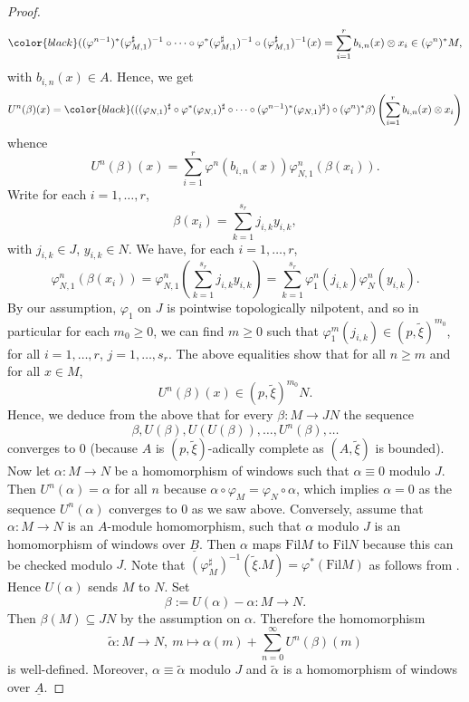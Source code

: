 \documentclass{amsart}
\theoremstyle{plain}
\theoremstyle{definition}
\newcommand{\tilxi}{\tilde{\xi}}
\newcommand{\blue}[1]{{\color{black}#1}}
\begin{document}
\begin{proof}
  $$
    \blue{ ((\varphi^{n-1})^\ast (\varphi_{M,1}^\sharp)^{-1} \circ \dots \circ \varphi^\ast (\varphi_{M,1}^\sharp)^{-1} \circ (\varphi_{M,1}^\sharp)^{-1} (x) } = \sum_{i=1}^r b_{i,n}(x) \otimes x_i \in (\varphi^n)^\ast M, 
   $$
   with $b_{i,n}(x) \in A$.
   Hence, we get 
   $$
   U^n(\beta)(x)= \blue{(((\varphi_{N,1})^\sharp \circ \varphi^\ast (\varphi_{N,1})^\sharp  \circ \dots \circ (\varphi^{n-1})^\ast (\varphi_{N,1})^\sharp) }\circ (\varphi^n)^\ast \beta) \left(  \sum_{i=1}^r b_{i,n}(x) \otimes x_i \right)
   $$ 
    whence
   $$
   U^n(\beta)(x)= \sum_{i=1}^r \varphi^n(b_{i,n}(x)) \varphi_{N,1}^n(\beta(x_i)).
   $$
    Write for each $i=1,\dots, r$,
  $$
  \beta(x_i)=\sum_{k=1}^{s_r} j_{i,k} y_{i,k},
  $$
   with $j_{i,k} \in J$, $y_{i,k} \in N$.
   We have, for each $i=1,\dots, r$, 
  $$
  \varphi_{N,1}^n(\beta(x_i)) = \varphi_{N,1}^n \left(\sum_{k=1}^{s_r} j_{i,k} y_{i,k}\right) = \sum_{k=1}^{s_r} \varphi_1^n(j_{i,k}) \varphi_{N}^n(y_{i,k}).
  $$
  By our assumption, $\varphi_1$ on $J$ is pointwise topologically nilpotent, and so in particular for each $m_0 \geq 0$, we can find $m\geq 0$ such that $\varphi_1^m(j_{i,k}) \in (p,\tilxi)^{m_0}$, for all $i=1,\dots, r$, $j=1,\dots, s_r$. The above equalities show that for all $n\geq m$ and for all $x\in M$, 
  $$
  U^n(\beta)(x) \in (p,\tilxi)^{m_0} N.
  $$
 Hence, we deduce from the above that for every $\beta\colon M\to JN$ the sequence
  $$
  \beta, U(\beta),U(U(\beta)),\ldots, U^n(\beta),\ldots
  $$
  converges to $0$ (because $A$ is $(p,\tilxi)$-adically complete as $(A,\tilxi)$ is bounded).
  Now let $\alpha\colon M\to N$ be a homomorphism of windows such that $\alpha\equiv 0$ modulo $J$. Then $U^n(\alpha)=\alpha$ for all $n$ because $\alpha\circ \varphi_M=\varphi_N\circ \alpha$, which implies $\alpha=0$ as the sequence $U^n(\alpha)$ converges to $0$ as we saw above.
  Conversely, assume that $\alpha\colon M\to N$ is an $A$-module homomorphism, such that $\alpha$ modulo $J$ is an homomorphism of windows over $\underline{B}$. Then $\alpha$ maps $\mathrm{Fil} M$ to $\mathrm{Fil} N$ because this can be checked modulo $J$. Note that $(\varphi_M^\sharp)^{-1}(\tilxi.M)= \varphi^\ast(\mathrm{Fil} M)$ as follows from . Hence $U(\alpha)$ sends $M$ to $N$. Set
  $$
  \beta:= U(\alpha)-\alpha\colon M\to N.
  $$
  Then $\beta(M)\subseteq JN$ by the assumption on $\alpha$. Therefore the homomorphism
  $$
\tilde{\alpha}\colon M\to N,\ m\mapsto \alpha(m)+\sum\limits_{n=0}^\infty U^n(\beta)(m)
$$
is well-defined. Moreover, $\alpha\equiv \tilde{\alpha}$ modulo $J$ and $\tilde{\alpha}$ is a homomorphism of windows over $\underline{A}$.
 \end{proof}
\end{document}
